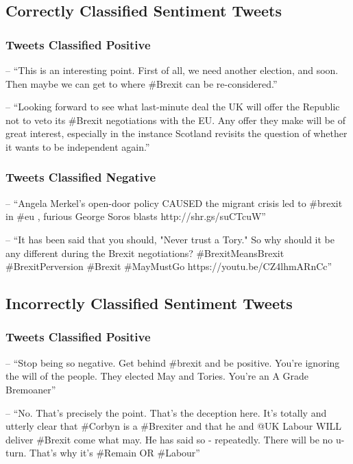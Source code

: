 \documentclass[11pt]{report}
\begin{document}
\subsection*{Correctly Classified Sentiment Tweets}

\subsubsection*{Tweets Classified Positive}
-- ``This is an interesting point. First of all, we need another election, and soon. Then maybe we can get to where \#Brexit can be re-considered.''

-- ``Looking forward to see what last-minute deal the UK will offer the Republic not to veto its \#Brexit negotiations with the EU. Any offer they make will be of great interest, especially in the instance Scotland revisits the question of whether it wants to be independent again.''

\subsubsection*{Tweets Classified Negative}
-- ``Angela Merkel's open-door policy CAUSED the migrant crisis led to \#brexit in \#eu , furious George Soros blasts http://shr.gs/suCTcuW''

-- ``It has been said that you should, "Never trust a Tory." So why should it be any different during the Brexit negotiations? \#BrexitMeansBrexit \#BrexitPerversion \#Brexit \#MayMustGo https://youtu.be/CZ4lhmARnCc''

\subsection*{Incorrectly Classified Sentiment Tweets}

\subsubsection*{Tweets Classified Positive}
-- ``Stop being so negative. Get behind \#brexit and be positive. You're ignoring the will of the people. They elected May and Tories. You're an A Grade Bremoaner''

-- ``No. That's precisely the point. That's the deception here. It's totally and utterly clear that \#Corbyn is a \#Brexiter and that he and @UK Labour WILL deliver \#Brexit come what may. He has said so - repeatedly. There will be no u-turn. That's why it's \#Remain OR \#Labour''
\end{document}
